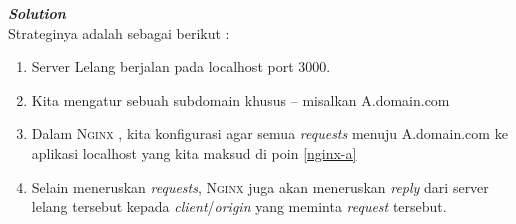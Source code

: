 \begin{enumerate}
	\textbf{\textit{Solution}} \\
	\indentenum Strateginya adalah sebagai berikut :
	\begin{enumerate}
		\item \label{nginx-a} Server Lelang berjalan pada localhost port 3000.
		\item \label{nginx-b} Kita mengatur sebuah subdomain khusus -- misalkan A.domain.com
		\item Dalam \textsc{Nginx} , kita konfigurasi agar semua \textit{requests} menuju A.domain.com ke aplikasi localhost yang kita maksud di poin \ref{nginx-a}
		\item Selain meneruskan \textit{requests}, \textsc{Nginx} juga akan meneruskan \textit{reply} dari server lelang tersebut kepada \textit{client}/\textit{origin} yang meminta \textit{request} tersebut.				
	\end{enumerate}
\end{enumerate}